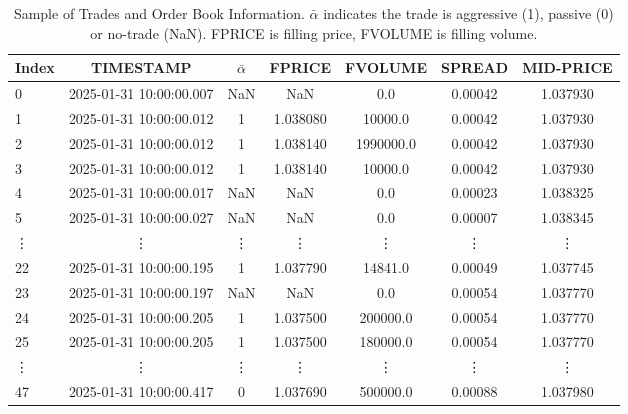 \begin{table}[htbp]
\centering
    \begin{tabular}{lcccccc}
    \toprule
    \textbf{Index} & \textbf{TIMESTAMP} & \textbf{$\bar{\alpha}$} & \textbf{FPRICE} & \textbf{FVOLUME} & \textbf{SPREAD} & \textbf{MID-PRICE} \\
    \midrule
    0  & 2025-01-31 10:00:00.007 & NaN & NaN   & 0.0      & 0.00042 & 1.037930 \\
    1  & 2025-01-31 10:00:00.012 & 1 & 1.038080 & 10000.0  & 0.00042 & 1.037930 \\
    2  & 2025-01-31 10:00:00.012 & 1 & 1.038140 & 1990000.0 & 0.00042 & 1.037930 \\
    3  & 2025-01-31 10:00:00.012 & 1 & 1.038140 & 10000.0  & 0.00042 & 1.037930 \\
    4  & 2025-01-31 10:00:00.017 & NaN & NaN & 0.0      & 0.00023 & 1.038325 \\
    5  & 2025-01-31 10:00:00.027 & NaN & NaN & 0.0      & 0.00007 & 1.038345 \\
    \vdots & \vdots & \vdots & \vdots & \vdots & \vdots & \vdots \\
    22 & 2025-01-31 10:00:00.195 & 1 & 1.037790 & 14841.0  & 0.00049 & 1.037745 \\
    23 & 2025-01-31 10:00:00.197 & NaN & NaN & 0.0      & 0.00054 & 1.037770 \\
    24 & 2025-01-31 10:00:00.205 & 1 & 1.037500 & 200000.0 & 0.00054 & 1.037770 \\
    25 & 2025-01-31 10:00:00.205 & 1 & 1.037500 & 180000.0 & 0.00054 & 1.037770 \\
    \vdots & \vdots & \vdots & \vdots & \vdots & \vdots & \vdots \\
    47 & 2025-01-31 10:00:00.417 & 0 & 1.037690 & 500000.0 & 0.00088 & 1.037980 \\
    \bottomrule
    \end{tabular}
\caption{Sample of Trades and Order Book Information. $\bar{\alpha}$ indicates the trade is aggressive (1), passive (0) or no-trade (NaN). FPRICE is filling price, FVOLUME is filling volume.}\label{tab:trade_sample}
\end{table}

